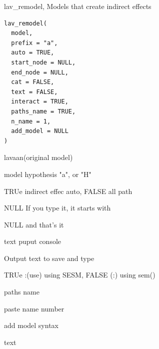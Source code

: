 \documentclass[a4paper]{book}
\begin{document}
%
\begin{Description}
lav\_remodel, Models that create indirect effects
\end{Description}
%
\begin{Usage}
\begin{verbatim}
lav_remodel(
  model,
  prefix = "a",
  auto = TRUE,
  start_node = NULL,
  end_node = NULL,
  cat = FALSE,
  text = FALSE,
  interact = TRUE,
  paths_name = TRUE,
  n_name = 1,
  add_model = NULL
)
\end{verbatim}
\end{Usage}
%
\begin{Arguments}
\begin{ldescription}
\item[\code{model}] lavaan(original model)

\item[\code{prefix}] model hypothesis "a", or "H"

\item[\code{auto}] TRUe indirect effec auto, FALSE all path

\item[\code{start\_node}] NULL If you type it, it starts with

\item[\code{end\_node}] NULL and that's it

\item[\code{cat}] text puput console

\item[\code{text}] Output text to save and type

\item[\code{interact}] TRUe :(use) using SESM, FALSE (:) using sem()

\item[\code{paths\_name}] paths name

\item[\code{n\_name}] paste name number

\item[\code{add\_model}] add model syntax
\end{ldescription}
\end{Arguments}
%
\begin{Value}
text
\end{Value}
%
\end{document}
